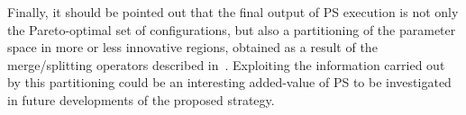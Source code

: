 Finally, it should be pointed out that the final output of PS
execution is not only the Pareto-optimal set of configurations, but also
a partitioning of the parameter space in more or less innovative
regions, obtained as a result of the merge/splitting operators
described in~. Exploiting the information carried out
by this partitioning could be an interesting added-value of PS to be
investigated in future developments of the proposed strategy.



